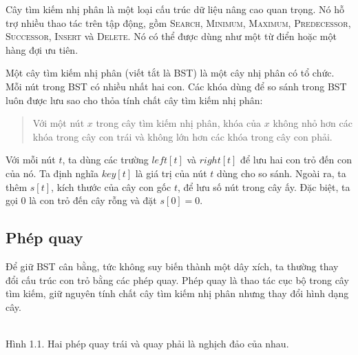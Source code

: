 \documentclass[11pt]{article}
\newcommand{\sbtleafat}[2]{%
  \begin{scope}[shift={(#1)}]
    \draw[sbt leaf] (0,0.42)--(-0.45,-0.32)--(0.45,-0.32)--cycle;
    \node[font=\small] at (0,-0.02) {$#2$};
  \end{scope}%
}
\begin{document}
Cây tìm kiếm nhị phân là một loại cấu trúc dữ liệu nâng cao quan trọng. Nó hỗ
trợ nhiều thao tác trên tập động, gồm \textsc{Search}, \textsc{Minimum},
\textsc{Maximum}, \textsc{Predecessor}, \textsc{Successor}, \textsc{Insert}
và \textsc{Delete}. Nó có thể được dùng như một từ điển hoặc một hàng đợi ưu
tiên.

Một cây tìm kiếm nhị phân (viết tắt là BST) là một cây nhị phân có tổ chức.
Mỗi nút trong BST có nhiều nhất hai con. Các khóa dùng để so sánh trong BST
luôn được lưu sao cho thỏa tính chất cây tìm kiếm nhị phân:

\begin{quote}
Với một nút $x$ trong cây tìm kiếm nhị phân, khóa của $x$ không nhỏ hơn các
khóa trong cây con trái và không lớn hơn các khóa trong cây con phải.
\end{quote}

Với mỗi nút $t$, ta dùng các trường $\mathit{left}[t]$ và $\mathit{right}[t]$
để lưu hai con trỏ đến con của nó. Ta định nghĩa $\mathit{key}[t]$ là giá trị
của nút $t$ dùng cho so sánh. Ngoài ra, ta thêm $s[t]$, kích thước của cây con
gốc $t$, để lưu số nút trong cây ấy. Đặc biệt, ta gọi $0$ là con trỏ đến cây
rỗng và đặt $s[0]=0$.

\subsection{Phép quay}

Để giữ BST cân bằng, tức không suy biến thành một dây xích, ta thường thay
đổi cấu trúc con trỏ bằng các phép quay. Phép quay là thao tác cục bộ trong
cây tìm kiếm, giữ nguyên tính chất cây tìm kiếm nhị phân nhưng thay đổi hình
dạng cây.

\begin{center}
\\[-0.2em]
{\small Hình 1.1. Hai phép quay trái và quay phải là nghịch đảo của nhau.}
\end{center}
\end{document}
